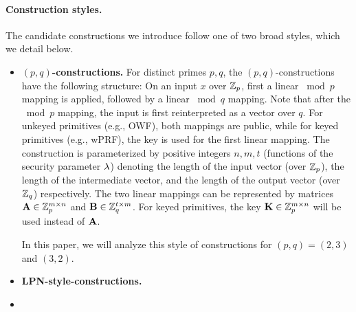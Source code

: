 


\paragraph{Construction styles.}
The candidate constructions we introduce follow one of two broad styles, which we detail below.

\begin{itemize}
    \item \textbf{$(p,q)$-constructions.}
    For distinct primes $p, q$, the $(p,q)$-constructions have the following structure: On an input $x$ over $\mathbb{Z}_p$, first a linear $\bmod p$ mapping is applied, followed by a linear $\bmod q$ mapping. Note that after the $\bmod p$ mapping, the input is first reinterpreted as a vector over $q$. For unkeyed primitives (e.g., OWF), both mappings are public, while for keyed primitives (e.g., wPRF), the key is used for the first linear mapping. The construction is parameterized by positive integers $n, m, t$ (functions of the security parameter $\lambda$) denoting the length of the input vector (over $\mathbb{Z}_p$), the length of the intermediate vector, and the length of the output vector (over $\mathbb{Z}_q$) respectively. The two linear mappings can be represented by matrices $\mat{A} \in \Z_p^{m \times n}$ and $\mat{B} \in \Z_q^{t \times m}$. For keyed primitives, the key $\mat{K} \in \Z_p^{m \times n}$ will be used instead of $\mat{A}$.


    In this paper, we will analyze this style of constructions for $(p,q) = (2,3)$ and $(3,2)$. 


    \item \textbf{LPN-style-constructions.} 

    \item {}
\end{itemize}




\newpage




